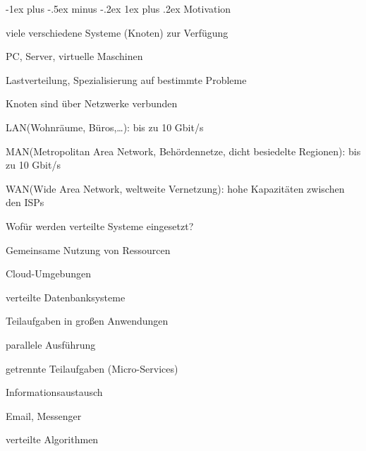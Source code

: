 \documentclass[10pt]{article}
\makeatletter
\renewcommand{\subsubsection}{\@startsection{subsubsection}{3}{0mm}%
                                {-1ex plus -.5ex minus -.2ex}%
                                {1ex plus .2ex}%
                                {\normalfont\small\bfseries}}
\makeatother
\begin{document}
\subsubsection{Motivation}
\begin{itemize*}
  \item viele verschiedene Systeme (Knoten) zur Verfügung
  \begin{itemize*}
    \item PC, Server, virtuelle Maschinen
    \item Lastverteilung, Spezialisierung auf bestimmte Probleme
  \end{itemize*}
  \item Knoten sind über Netzwerke verbunden
  \begin{itemize*}
    \item LAN(Wohnräume, Büros,…): bis zu 10 Gbit/s
    \item MAN(Metropolitan Area Network, Behördennetze, dicht besiedelte Regionen): bis zu 10 Gbit/s
    \item WAN(Wide Area Network, weltweite Vernetzung): hohe Kapazitäten zwischen den ISPs
  \end{itemize*}
\end{itemize*}
Wofür werden verteilte Systeme eingesetzt? 
\begin{itemize*}
  \item Gemeinsame Nutzung von Ressourcen
  \begin{itemize*}
    \item Cloud-Umgebungen
    \item verteilte Datenbanksysteme
    
  \end{itemize*}
  \item Teilaufgaben in großen Anwendungen
  \begin{itemize*}
    \item parallele Ausführung
    \item getrennte Teilaufgaben (Micro-Services)
    
  \end{itemize*}
  \item Informationsaustausch
  \begin{itemize*}
    \item Email, Messenger
    \item verteilte Algorithmen
  \end{itemize*}
\end{itemize*}
\end{document}

